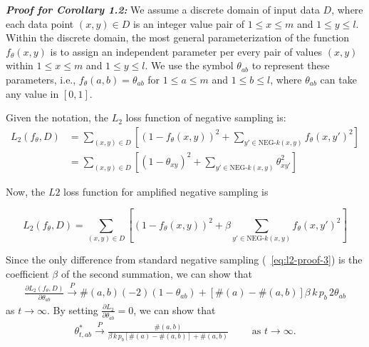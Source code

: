 \textbf{\textit{Proof for Corollary 1.2:}} 
We assume a discrete domain of input data $D$, where each data point $(x, y) \in D$ is an integer value pair of $1 \le x \le m$ and $1 \le y \le l$. Within the discrete domain, the most general parameterization of the function $f_{\theta}(x, y)$ is to assign an independent parameter per every pair of values $(x, y)$ within $1 \le x \le m$ and $1 \le y \le l$. We use the symbol $\theta_{ab}$ to represent these parameters, i.e., $f_{\theta}(a, b) = \theta_{ab}$ for $1 \le a \le m$ and $1 \le b \le l$, where $\theta_{ab}$ can take any value in $[0, 1]$.

Given the notation, the $L_2$ loss function of negative sampling is:
\begin{align}
L_2(f_{\theta},D) &= \sum_{(x,y)\in D} \left[(1 - f_{\theta}(x, y))^2 + \sum_{y' \in \text{NEG-}k(x,y)} f_{\theta}(x, y')^2 \right] \label{eq:l2-proof-3}\\
&= \sum_{(x,y)\in D} \left[(1 - \theta_{xy})^2 + \sum_{y' \in \text{NEG-}k(x,y)} \theta_{xy'}^2 \right] \label{eq:l2-proof1}
\end{align}


Now, the $L2$ loss function for amplified negative sampling is 

\begin{equation}
L_2(f_\theta,D)   = \sum_{(x,y)\in D} \left[(1 - f_{\theta}(x, y))^2 + \beta \sum_{y' \in \text{NEG-}k(x,y)} f_{\theta}(x, y')^2 \right]
\end{equation}




Since the only difference from standard negative sampling (~\ref{eq:l2-proof-3})  is the coefficient $\beta$ of the second summation, we can show that
\begin{equation}
\begin{array}{l}
\frac{\partial L_2(f_{\theta},D)}{\partial \theta_{ab}}  \xrightarrow{P} \#(a,b)(-2)(1-\theta_{ab}) + [\#(a) - \#(a,b)] \beta \, k\, p_{b} \, 2\theta_{ab}

\end{array}
\end{equation}
as $t \rightarrow \infty$. By setting $\frac{\partial L_2}{\partial \theta_{ab}} = 0$, we can show that
\begin{equation}
\begin{array}{l}
\theta_{t,ab}^{*} \xrightarrow{P} \frac{\#(a,b)}{\beta\, k \,p_{b} [\#(a)- \#(a,b)] + \#(a,b)} \qquad\text{ as } t \rightarrow \infty.
\end{array}
\label{eq:amplify}
\end{equation}

